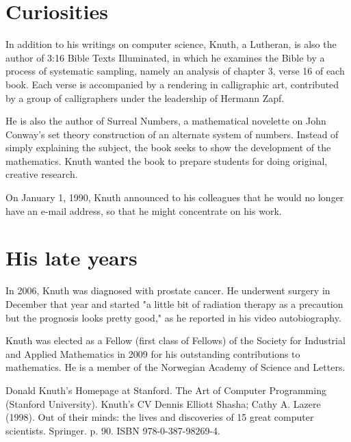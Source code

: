 \documentclass[a4paper,11pt]{article}
\begin{document}
\section{Curiosities}
In addition to his writings on computer science, Knuth, a Lutheran, 
is also the author of 3:16 Bible Texts Illuminated, in which he 
examines the Bible by a process of systematic sampling, namely an 
analysis of chapter 3, verse 16 of each book. Each verse is accompanied 
by a rendering in calligraphic art, contributed by a group of calligraphers 
under the leadership of Hermann Zapf.

He is also the author of Surreal Numbers, a mathematical novelette 
on John Conway's set theory construction of an alternate system of 
numbers. Instead of simply explaining the subject, the book seeks to 
show the development of the mathematics. Knuth wanted the book to 
prepare students for doing original, creative research.

On January 1, 1990, Knuth announced to his colleagues that he would 
no longer have an e-mail address, so that he might concentrate on his work.

\section{His late years}
In 2006, Knuth was diagnosed with prostate cancer. He underwent surgery 
in December that year and started "a little bit of radiation therapy  
as a precaution but the prognosis looks pretty good," as he reported 
in his video autobiography.

Knuth was elected as a Fellow (first class of Fellows) of the Society 
for Industrial and Applied Mathematics in 2009 for his outstanding 
contributions to mathematics. He is a member of the Norwegian 
Academy of Science and Letters.

\begin{thebibliography}{99}
  Donald Knuth's Homepage at Stanford.
 The Art of Computer Programming (Stanford University).
 Knuth's CV
 Dennis Elliott Shasha; Cathy A. Lazere (1998). Out of their minds: the lives and discoveries of 15 great computer scientists. Springer. p. 90. ISBN 978-0-387-98269-4.
\end{thebibliography}
\end{document}
